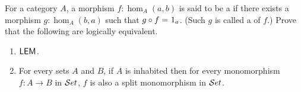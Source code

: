 \documentclass[hott-all.tex]{subfiles}
\begin{document}
% 
\begin{ex}
  For a category $A$, a morphism $f: \hom_A(a,b)$ is said to be a  if there exists a morphism $g: \hom_A(b,a)$ such that $g \circ f =_{} 1_a$. (Such $g$ is called a  of $f$.)
  Prove that the following are logically equivalent.
  \begin{enumerate}
  \item $\mathsf{LEM}_{}$.
  \item For every sets $A$ and $B$, if $A$ is inhabited then for every monomorphism $f: A \to B$ in $\mathcal{S}et$, $f$ is also a split monomorphism in $\mathcal{S}et$.
  \end{enumerate}
\end{ex}
% 
% 
% 
% 
\end{document}
